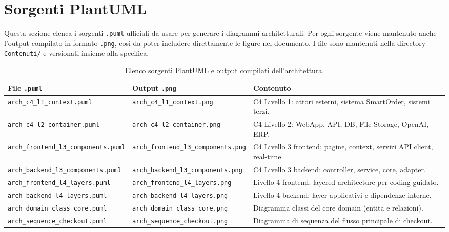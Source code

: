 \documentclass[a4paper, 11pt, oneside]{scrartcl}
\begin{document}
\newpage
\section{Sorgenti PlantUML}

Questa sezione elenca i sorgenti \texttt{.puml} ufficiali da usare per generare i diagrammi architetturali.
Per ogni sorgente viene mantenuto anche l'output compilato in formato \texttt{.png}, cosi da poter includere direttamente le figure nel documento.
I file sono mantenuti nella directory \texttt{Contenuti/} e versionati insieme alla specifica.

\begin{table}[H]
    \centering
    \renewcommand{\arraystretch}{1.2}
    \begin{tabularx}{\textwidth}{@{}l l L@{}}
        \toprule
        \textbf{File \texttt{.puml}} & \textbf{Output \texttt{.png}} & \textbf{Contenuto} \\
        \midrule
        \texttt{arch\_c4\_l1\_context.puml} & \texttt{arch\_c4\_l1\_context.png} & C4 Livello 1: attori esterni, sistema SmartOrder, sistemi terzi. \\
        \texttt{arch\_c4\_l2\_container.puml} & \texttt{arch\_c4\_l2\_container.png} & C4 Livello 2: WebApp, API, DB, File Storage, OpenAI, ERP. \\
        \texttt{arch\_frontend\_l3\_components.puml} & \texttt{arch\_frontend\_l3\_components.png} & C4 Livello 3 frontend: pagine, context, servizi API client, real-time. \\
        \texttt{arch\_backend\_l3\_components.puml} & \texttt{arch\_backend\_l3\_components.png} & C4 Livello 3 backend: controller, service, core, adapter. \\
        \texttt{arch\_frontend\_l4\_layers.puml} & \texttt{arch\_frontend\_l4\_layers.png} & Livello 4 frontend: layered architecture per coding guidato. \\
        \texttt{arch\_backend\_l4\_layers.puml} & \texttt{arch\_backend\_l4\_layers.png} & Livello 4 backend: layer applicativi e dipendenze interne. \\
        \texttt{arch\_domain\_class\_core.puml} & \texttt{arch\_domain\_class\_core.png} & Diagramma classi del core domain (entita e relazioni). \\
        \texttt{arch\_sequence\_checkout.puml} & \texttt{arch\_sequence\_checkout.png} & Diagramma di sequenza del flusso principale di checkout. \\
        \bottomrule
    \end{tabularx}
    \caption{Elenco sorgenti PlantUML e output compilati dell'architettura.}
\end{table}
\end{document}
